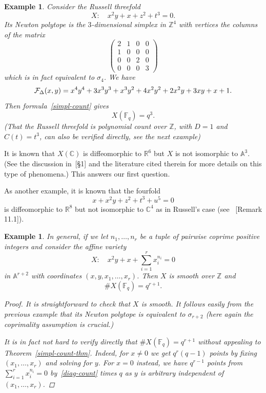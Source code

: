 \documentclass[12pt]{article}
\newcommand{\calF}{{\cal F}}
\newcommand{\Z}{{\mathbb Z}}
\newcommand{\R}{{\mathbb R}}
\newcommand{\F}{{\mathbb F}}
\newcommand{\C}{{\mathbb C}}
\newcommand{\A}{\mathbb A}
\newtheorem{example}[theorem]{Example}
\begin{document}
\begin{example}
Consider the Russell threefold~\cite{MR2327241}
$$
X: \quad x^2y+x+z^2+t^3=0.
$$
Its Newton polytope is the $3$-dimensional simplex in $\Z^4$ with
vertices the columns of the matrix
$$
\left(
\begin{array}{cccc}
2&1&0&0\\
1&0&0&0\\
0&0&2&0\\
0&0&0&3
\end{array}
\right)
$$
which is in fact equivalent to $\sigma_4$. We have
$$
\calF_\Delta(x,y)=x^4y^4 + 3x^3y^3 + x^3y^2 + 4x^2y^2 +
2x^2y + 3xy + x + 1.
$$
Then formula~\eqref{simpl-count} gives
$$
X(\F_q)=q^3.
$$
(That the Russell threefold is polynomial count over $\Z$, with $D=1$ and $C(t)=t^3$, can also be verified directly, see the next example)



\end{example}
It is known that $X(\C)$ is diffeomorphic to $\R^6$ but $X$ is not
isomorphic to $\A^3$. (See the discussion in~\cite{MR2327241}[\S1] and
the literature cited therein for more details on this type of
phenomena.) This answers our first question.

As another example, it is known that the fourfold
$$
x+x^2y+z^2+t^3+u^5 =0
$$
is diffeomorphic to $\R^8$ but not isomorphic to $\C^4$ as in
Russell's case (see ~\cite{MR2327241}[Remark 11.1]).

\begin{example}
  In general, if we let $n_1,\ldots,n_r$ be a tuple of pairwise coprime
  positive integers and consider the affine variety
$$
X:\quad x^2y+x+\sum_{i=1}^r x_i^{n_i}= 0
$$
in $\A^{r+2}$ with coordinates $(x,y,x_1,\ldots,x_r)$. 
Then $X$ is smooth over $\Z$ and 
$$
\#X(\F_q)=q^{r+1}.
$$
\begin{proof}
It is straightforward to check that $X$ is smooth. It follows easily
from the previous example that its Newton polytope is equivalent to
$\sigma_{r+2}$ (here again the coprimality assumption is crucial.)

It is in fact not hard to verify directly that $\#X(\F_q)=q^{r+1}$
without appealing to Theorem~\ref{simpl-count-thm}.  Indeed, for
$x\neq0$ we get $q^r(q-1)$ points by fixing $(x_1,\ldots,x_r)$ and
solving for $y$. For $x=0$ instead, we have $q^{r-1}$ points from
$\sum_{i=1}^rx_i^{n_i}=0$ by~\eqref{diag-count} times $q$ as $y$ is
arbitrary independent of $(x_1,\ldots,x_r)$.
\end{proof}

\end{example}
\end{document}
